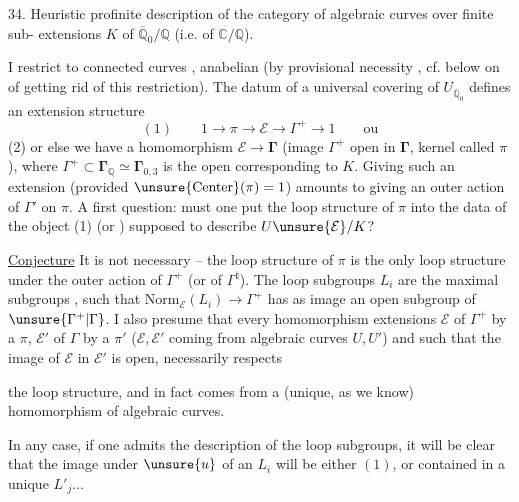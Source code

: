 34. Heuristic profinite description of the category
of algebraic curves  over  finite sub-
extensions $K$ of $\overline{\mathbb Q}_0/\mathbb Q$ (i.e. of $\mathbb C/\mathbb Q$).

I restrict to  connected curves , anabelian
(by provisional necessity \unsure{!}, cf. below on  of
getting rid of this restriction). The datum of
a universal covering of  $U_{\overline{\mathbb Q}_0}$ defines an
extension structure
\[
(1)\qquad 1\longrightarrow\pi\longrightarrow\mathcal E\longrightarrow\Gamma^{+}\longrightarrow1\qquad\text{ou}
\]
(2) or else we have a homomorphism $\mathcal E\longrightarrow\boldsymbol{\Gamma}$
(image $\Gamma^{+}$ open in $\boldsymbol{\Gamma}$,
kernel called $\pi$),
where $\Gamma^{+}\subset\boldsymbol{\Gamma}_{\mathbb Q}\simeq\boldsymbol{\Gamma}_{0,3}$ is the open 
corresponding to $K$. Giving such an
extension (provided $\unsure{\mathrm{Center}}(\pi)=1$) amounts to
giving an outer action of $\Gamma'$ on $\pi$.
A first question: must one put the
loop structure of $\pi$ into the data  of
the object (1) (or ) supposed to describe $U\unsure{\mathcal E}/K$?

\uline{Conjecture} It is not necessary -- the loop structure
of $\pi$ is the only loop structure 
under the outer action of $\Gamma^{+}$ (or of $\Gamma^{\natural}$). The
loop subgroups $L_i$ are the maximal
subgroups , such that $\mathrm{Norm}_{\mathcal E}(L_i)\longrightarrow\Gamma^{+}$ has
as image an open subgroup of $\unsure{\Gamma^{+}|\Gamma}$.
I
also presume that every homomorphism  extensions
$\mathcal E$ of $\Gamma^{+}$ by a $\pi$, $\mathcal E'$ of $\Gamma$ by a $\pi'$
($\mathcal E,\mathcal E'$ coming from algebraic curves $U,U'$) and such
that the image of $\mathcal E$ in $\mathcal E'$ is open, necessarily respects

the loop structure, and in fact
comes from a (unique, as we know) homomorphism of algebraic
curves.

In any case, if one admits the description of the
loop subgroups, it will be clear that the image under
$\unsure{u}$ of an $L_i$ will be either $(1)$, or contained
in a unique $L'_j\ldots$

